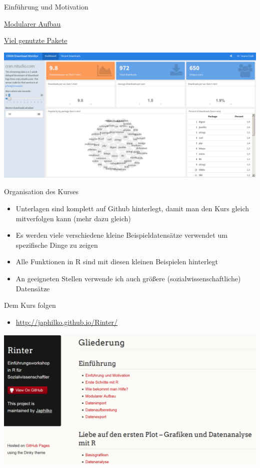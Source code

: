 \documentclass[ignorenonframetext,]{beamer}
\providecommand{\tightlist}{%
\setlength{\itemsep}{0pt}\setlength{\parskip}{0pt}}
\begin{document}
\begin{frame}[fragile]{Einführung und Motivation}
\begin{block}{\href{http://stats.idre.ucla.edu/r/seminars/intro/}{Modularer
Aufbau}}
\end{block}

\begin{block}{\href{https://gallery.shinyapps.io/cran-gauge/}{Viel
genutzte Pakete}}

\includegraphics{./tex2pdf.9796/a853199d8c52109309acb7b49e363481b04e7192.png}

\end{block}

\begin{block}{Organisation des Kurses}

\begin{itemize}
\tightlist
\item
  Unterlagen sind komplett auf Github hinterlegt, damit man den Kurs
  gleich mitverfolgen kann (mehr dazu gleich)
\item
  Es werden viele verschiedene kleine Beispieldatensätze verwendet um
  spezifische Dinge zu zeigen
\item
  Alle Funktionen in R sind mit diesen kleinen Beispielen hinterlegt
\item
  An geeigneten Stellen verwende ich auch größere
  (sozialwissenschaftliche) Datensätze
\end{itemize}

\end{block}

\begin{block}{Dem Kurs folgen}

\begin{itemize}
\tightlist
\item
  \url{http://japhilko.github.io/Rinter/}
\end{itemize}

\includegraphics{./tex2pdf.9796/e5396dc35519dd7e8a956d83df6bf7985683ee7e.png}


\end{block}
\end{frame}
\end{document}
